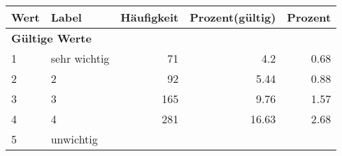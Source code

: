      \begin{longtable}{lXrrr}
     \toprule
     \textbf{Wert} & \textbf{Label} & \textbf{Häufigkeit} & \textbf{Prozent(gültig)} & \textbf{Prozent} \\
     \endhead
     \midrule
     \multicolumn{5}{l}{\textbf{Gültige Werte}}\\

     1 &
     \multicolumn{1}{X}{ sehr wichtig   } &


       \num{71} &
       \num[round-mode=places,round-precision=2]{4,2} &
         \num[round-mode=places,round-precision=2]{0,68} \\

     2 &
     \multicolumn{1}{X}{ 2   } &


       \num{92} &
       \num[round-mode=places,round-precision=2]{5,44} &
         \num[round-mode=places,round-precision=2]{0,88} \\

     3 &
     \multicolumn{1}{X}{ 3   } &


       \num{165} &
       \num[round-mode=places,round-precision=2]{9,76} &
         \num[round-mode=places,round-precision=2]{1,57} \\

     4 &
     \multicolumn{1}{X}{ 4   } &


       \num{281} &
       \num[round-mode=places,round-precision=2]{16,63} &
         \num[round-mode=places,round-precision=2]{2,68} \\

     5 &
     \multicolumn{1}{X}{ unwichtig   } &



\end{longtable}
